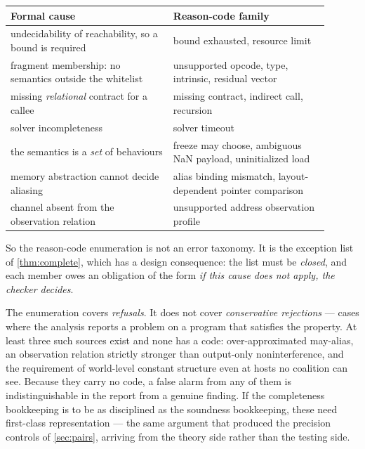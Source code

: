 \begin{center}
\begin{tabular}{@{}p{0.46\linewidth} p{0.44\linewidth}@{}}
\toprule
Formal cause & Reason-code family \\
\midrule
undecidability of reachability, so a bound is required
  & bound exhausted, resource limit \\
fragment membership: no semantics outside the whitelist
  & unsupported opcode, type, intrinsic, residual vector \\
missing \emph{relational} contract for a callee
  & missing contract, indirect call, recursion \\
solver incompleteness
  & solver timeout \\
the semantics is a \emph{set} of behaviours
  & freeze may choose, ambiguous NaN payload, uninitialized load \\
memory abstraction cannot decide aliasing
  & alias binding mismatch, layout-dependent pointer comparison \\
channel absent from the observation relation
  & unsupported address observation profile \\
\bottomrule
\end{tabular}
\end{center}

So the reason-code enumeration is not an error taxonomy. It is the exception list
of \cref{thm:complete}, which has a design consequence: the list must be
\emph{closed}, and each member owes an obligation of the form \emph{if this cause
does not apply, the checker decides}.

\begin{remark}
\label{rem:falsealarm}
The enumeration covers \emph{refusals}. It does not cover \emph{conservative
rejections} --- cases where the analysis reports a problem on a program that
satisfies the property. At least three such sources exist and none has a code:
over-approximated may-alias, an observation relation strictly stronger than
output-only noninterference, and the requirement of world-level constant
structure even at hosts no coalition can see. Because they carry no code, a false
alarm from any of them is indistinguishable in the report from a genuine finding.
If the completeness bookkeeping is to be as disciplined as the soundness
bookkeeping, these need first-class representation --- the same argument that
produced the precision controls of \cref{sec:pairs}, arriving from the theory
side rather than the testing side.
\end{remark}

